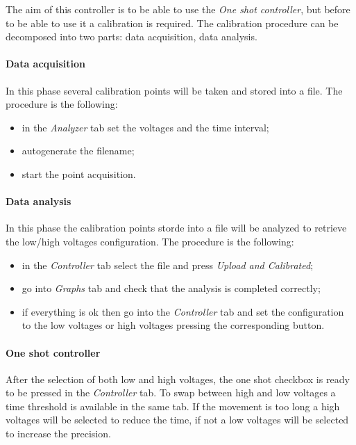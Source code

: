 

The aim of this controller is to be able to use the \emph{One shot
  controller}, but before to be able to use it a calibration is required. The calibration procedure can be decomposed into two parts:
data acquisition, data analysis.

\paragraph{Data acquisition}

In this phase several calibration points will be taken and stored into a file. The procedure
is the following:

\begin{itemize}
  \itemsep1pt\parskip0pt
  \item
        in the \emph{Analyzer} tab set the voltages and the time interval;
  \item
        autogenerate the filename;
  \item
        start the point acquisition.
\end{itemize}

\paragraph{Data analysis}

In this phase the calibration points storde into a
file will be analyzed to retrieve the low/high voltages configuration. The procedure is the following:

\begin{itemize}
  \itemsep1pt\parskip0pt
  \item
        in the \emph{Controller} tab select the file and press \emph{Upload
          and Calibrated};
  \item
        go into \emph{Graphs} tab and check that the analysis is completed
        correctly;
  \item
        if everything is ok then go into the \emph{Controller} tab and set the
        configuration to the low voltages or high voltages pressing the
        corresponding button.
\end{itemize}

\paragraph{One shot controller}

After the selection of both low and high voltages, the one shot checkbox is ready to be pressed in the \emph{Controller} tab. To
swap between high and low voltages a time threshold is available in the same tab. If the movement is too long a high voltages will be selected to reduce the time, if not a low voltages will be selected to increase the precision.


% 
